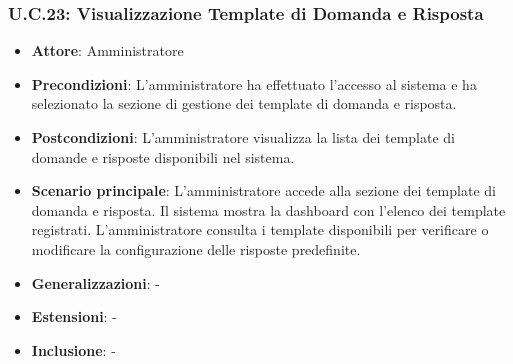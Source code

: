 \subsubsection{U.C.23: Visualizzazione Template di Domanda e Risposta}
\begin{itemize}
    \item \textbf{Attore}: Amministratore
    \item \textbf{Precondizioni}: L’amministratore ha effettuato l’accesso al sistema e ha selezionato la sezione di gestione dei template di domanda e risposta.
    \item \textbf{Postcondizioni}: L’amministratore visualizza la lista dei template di domande e risposte disponibili nel sistema.
    \item \textbf{Scenario principale}: L’amministratore accede alla sezione dei template di domanda e risposta. Il sistema mostra la dashboard con l’elenco dei template registrati. L’amministratore consulta i template disponibili per verificare o modificare la configurazione delle risposte predefinite.    
    \item \textbf{Generalizzazioni}: -
    \item \textbf{Estensioni}: -
    \item \textbf{Inclusione}: -
\end{itemize}
